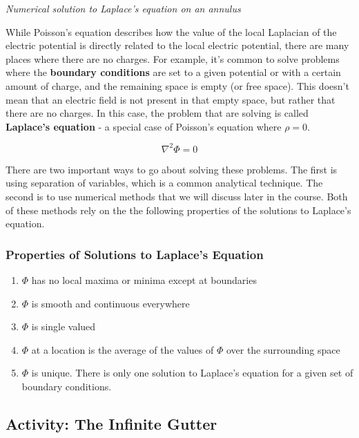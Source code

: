 \emph{Numerical solution to Laplace's equation on an annulus}

While Poisson's equation describes how the value of the local Laplacian
of the electric potential is directly related to the local electric
potential, there are many places where there are no charges. For
example, it's common to solve problems where the \textbf{boundary
conditions} are set to a given potential or with a certain amount of
charge, and the remaining space is empty (or free space). This doesn't
mean that an electric field is not present in that empty space, but
rather that there are no charges. In this case, the problem that are
solving is called \textbf{Laplace's equation} - a special case of
Poisson's equation where \(\rho = 0\).

\[\nabla^2 \Phi = 0\]

There are two important ways to go about solving these problems. The
first is using separation of variables, which is a common analytical
technique. The second is to use numerical methods that we will discuss
later in the course. Both of these methods rely on the the following
properties of the solutions to Laplace's equation.

\subsubsection{Properties of Solutions to Laplace's
Equation}\label{properties-of-solutions-to-laplaces-equation}

\begin{enumerate}
\def\labelenumi{\arabic{enumi}.}
\tightlist
\item
  \(\Phi\) has no local maxima or minima except at boundaries
\item
  \(\Phi\) is smooth and continuous everywhere
\item
  \(\Phi\) is single valued
\item
  \(\Phi\) at a location is the average of the values of \(\Phi\) over
  the surrounding space
\item
  \(\Phi\) is unique. There is only one solution to Laplace's equation
  for a given set of boundary conditions.
\end{enumerate}

\subsection{Activity: The Infinite
Gutter}\label{activity-the-infinite-gutter}

